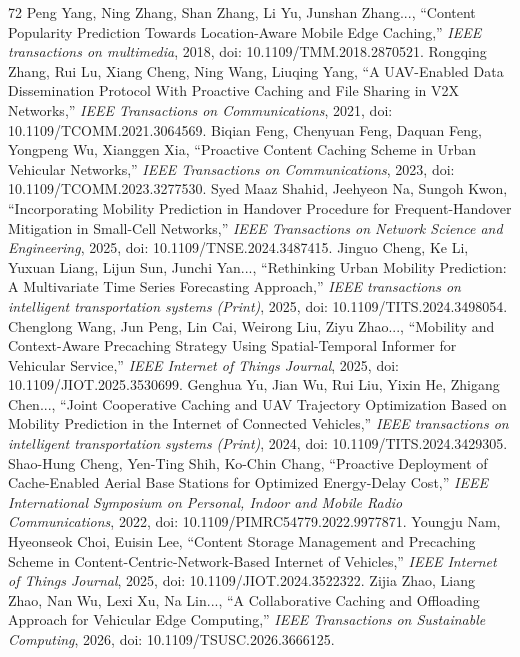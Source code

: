 \documentclass[journal]{IEEEtran}
\begin{document}
\begin{thebibliography}{72}
Peng Yang, Ning Zhang, Shan Zhang, Li Yu, Junshan Zhang..., ``Content Popularity Prediction Towards Location-Aware Mobile Edge Caching,'' \textit{IEEE transactions on multimedia}, 2018, doi: 10.1109/TMM.2018.2870521.
Rongqing Zhang, Rui Lu, Xiang Cheng, Ning Wang, Liuqing Yang, ``A UAV-Enabled Data Dissemination Protocol With Proactive Caching and File Sharing in V2X Networks,'' \textit{IEEE Transactions on Communications}, 2021, doi: 10.1109/TCOMM.2021.3064569.
Biqian Feng, Chenyuan Feng, Daquan Feng, Yongpeng Wu, Xianggen Xia, ``Proactive Content Caching Scheme in Urban Vehicular Networks,'' \textit{IEEE Transactions on Communications}, 2023, doi: 10.1109/TCOMM.2023.3277530.
Syed Maaz Shahid, Jeehyeon Na, Sungoh Kwon, ``Incorporating Mobility Prediction in Handover Procedure for Frequent-Handover Mitigation in Small-Cell Networks,'' \textit{IEEE Transactions on Network Science and Engineering}, 2025, doi: 10.1109/TNSE.2024.3487415.
Jinguo Cheng, Ke Li, Yuxuan Liang, Lijun Sun, Junchi Yan..., ``Rethinking Urban Mobility Prediction: A Multivariate Time Series Forecasting Approach,'' \textit{IEEE transactions on intelligent transportation systems (Print)}, 2025, doi: 10.1109/TITS.2024.3498054.
Chenglong Wang, Jun Peng, Lin Cai, Weirong Liu, Ziyu Zhao..., ``Mobility and Context-Aware Precaching Strategy Using Spatial-Temporal Informer for Vehicular Service,'' \textit{IEEE Internet of Things Journal}, 2025, doi: 10.1109/JIOT.2025.3530699.
Genghua Yu, Jian Wu, Rui Liu, Yixin He, Zhigang Chen..., ``Joint Cooperative Caching and UAV Trajectory Optimization Based on Mobility Prediction in the Internet of Connected Vehicles,'' \textit{IEEE transactions on intelligent transportation systems (Print)}, 2024, doi: 10.1109/TITS.2024.3429305.
Shao-Hung Cheng, Yen-Ting Shih, Ko-Chin Chang, ``Proactive Deployment of Cache-Enabled Aerial Base Stations for Optimized Energy-Delay Cost,'' \textit{IEEE International Symposium on Personal, Indoor and Mobile Radio Communications}, 2022, doi: 10.1109/PIMRC54779.2022.9977871.
Youngju Nam, Hyeonseok Choi, Euisin Lee, ``Content Storage Management and Precaching Scheme in Content-Centric-Network-Based Internet of Vehicles,'' \textit{IEEE Internet of Things Journal}, 2025, doi: 10.1109/JIOT.2024.3522322.
Zijia Zhao, Liang Zhao, Nan Wu, Lexi Xu, Na Lin..., ``A Collaborative Caching and Offloading Approach for Vehicular Edge Computing,'' \textit{IEEE Transactions on Sustainable Computing}, 2026, doi: 10.1109/TSUSC.2026.3666125.


\end{thebibliography}
\end{document}
